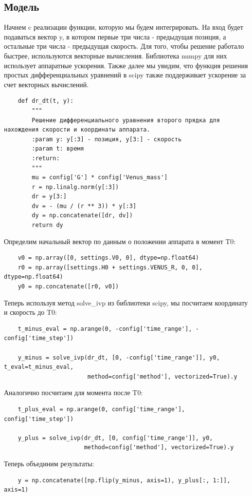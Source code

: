 \documentclass{article}
\begin{document}
    \subsection{Модель}
    Начнем c реализации функции, которую мы будем интегрировать. На вход будет подаваться вектор y, в котором первые три числа - предыдущая позиция, а остальные три числа - предыдущая скорость. Для того, чтобы решение работало быстрее, используются векторные вычисления. Библиотека numpy для них использует аппаратные ускорения. Также далее мы увидим, что функция решения простых дифференциальных уравнений в scipy также поддерживает ускорение за счет векторных вычислений.
    \begin{verbatim}
    def dr_dt(t, y):
        """
        Решение дифференциального уравнения второго прядка для нахождения скорости и координаты аппарата.
        :param y: y[:3] - позиция, y[3:] - скорость
        :param t: время
        :return: 
        """
        mu = config['G'] * config['Venus_mass']
        r = np.linalg.norm(y[:3])
        dr = y[3:]
        dv = - (mu / (r ** 3)) * y[:3]
        dy = np.concatenate([dr, dv])
        return dy
    \end{verbatim}
    Определим начальный вектор по данным о положении аппарата в момент T0:
    \begin{verbatim}
    v0 = np.array([0, settings.V0, 0], dtype=np.float64)
    r0 = np.array([settings.H0 + settings.VENUS_R, 0, 0], dtype=np.float64)
    y0 = np.concatenate([r0, v0])
    \end{verbatim}
    Теперь используя метод solve\_ivp из библиотеки scipy, мы посчитаем координату и скорость до T0: 
    \begin{verbatim}
    t_minus_eval = np.arange(0, -config['time_range'], -config['time_step'])

    y_minus = solve_ivp(dr_dt, [0, -config['time_range']], y0, t_eval=t_minus_eval, 
                        method=config['method'], vectorized=True).y
    \end{verbatim}
    Аналогично посчитаем для момента после T0:
    \begin{verbatim}
    t_plus_eval = np.arange(0, config['time_range'], config['time_step'])

    y_plus = solve_ivp(dr_dt, [0, config['time_range']], y0,
                       method=config['method'], vectorized=True).y
    \end{verbatim}
    Теперь объединим результаты:
    \begin{verbatim}
    y = np.concatenate([np.flip(y_minus, axis=1), y_plus[:, 1:]], axis=1)
    \end{verbatim}
\end{document}
